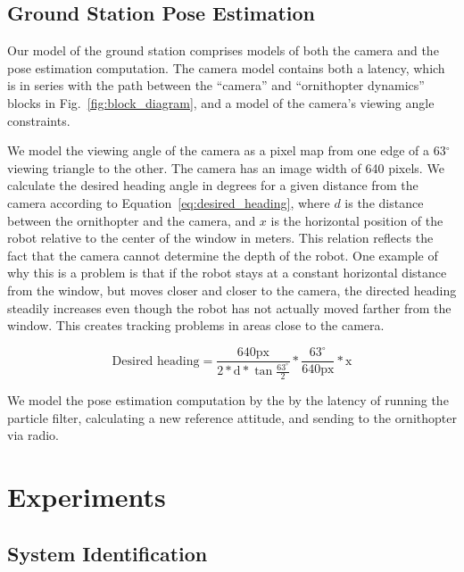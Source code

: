 \documentclass{aamas2013}
\begin{document}
\subsection{Ground Station Pose Estimation}

Our model of the ground station comprises models of both the camera and the
pose estimation computation. The camera model contains both a
latency, which is in series with the path between the ``camera'' and ``ornithopter dynamics''
 blocks in Fig.~\ref{fig:block_diagram}, and a model of the camera's viewing angle constraints. 
 
 We model the 
viewing angle of the camera as a pixel map from one edge of a
63$^{\circ}$ viewing triangle to the other. The camera has an image width of
640 pixels. We calculate the desired heading angle in degrees for a given distance from the
camera according to Equation~\ref{eq:desired_heading}, where $d$
is the distance between the ornithopter and the camera, and $x$ is the horizontal
position of the robot relative to the center of the window in meters. This
relation reflects the fact that the camera cannot determine the depth of the
robot. One example of why this is a problem is that if the robot stays at a
constant horizontal distance from the window, but moves closer and closer to
the camera, the directed heading steadily increases even though the robot has
not actually moved farther from the window. This creates tracking problems in
areas close to the camera.

\begin{equation} \label{eq:desired_heading} \text{Desired heading} =
\frac{640\text{px}}{2*\text{d}*\tan{\frac{63^{\circ}}{2}}}*\frac{63^{\circ}}{640\text{px}}*\text{x}
\end{equation}

We model the pose estimation computation by the by the latency of running 
the particle filter, calculating a new reference attitude, and sending to the ornithopter via radio.

\section{Experiments}

\subsection{System Identification}
\end{document}

